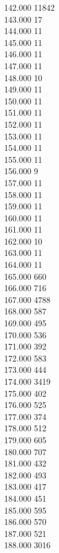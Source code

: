 { 142.000	11842 \\
 143.000	17 \\
 144.000	11 \\
 145.000	11 \\
 146.000	11 \\
 147.000	11 \\
 148.000	10 \\
 149.000	11 \\
 150.000	11 \\
 151.000	11 \\
 152.000	11 \\
 153.000	11 \\
 154.000	11 \\
 155.000	11 \\
 156.000	9 \\
 157.000	11 \\
 158.000	11 \\
 159.000	11 \\
 160.000	11 \\
 161.000	11 \\
 162.000	10 \\
 163.000	11 \\
 164.000	11 \\
 165.000	660 \\
 166.000	716 \\
 167.000	4788 \\
 168.000	587 \\
 169.000	495 \\
 170.000	536 \\
 171.000	392 \\
 172.000	583 \\
 173.000	444 \\
 174.000	3419 \\
 175.000	402 \\
 176.000	525 \\
 177.000	374 \\
 178.000	512 \\
 179.000	605 \\
 180.000	707 \\
 181.000	432 \\
 182.000	493 \\
 183.000	417 \\
 184.000	451 \\
 185.000	595 \\
 186.000	570 \\
 187.000	521 \\
 188.000	3016 \\
}
